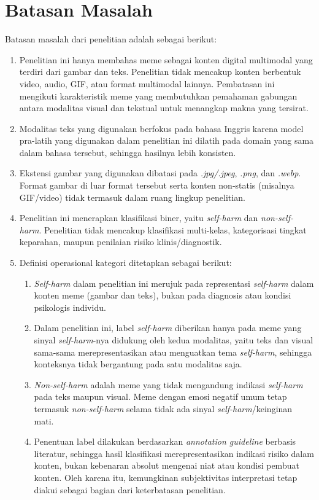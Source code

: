 \section{Batasan Masalah} \label{I.Batasan}
Batasan masalah dari penelitian adalah sebagai berikut: \par

\begin{enumerate}
    \item Penelitian ini hanya membahas meme sebagai konten digital multimodal yang terdiri dari gambar dan teks. Penelitian tidak mencakup konten berbentuk video, audio, GIF, atau format multimodal lainnya. Pembatasan ini mengikuti karakteristik meme yang membutuhkan pemahaman gabungan antara modalitas visual dan tekstual untuk menangkap makna yang tersirat.

    \item Modalitas teks yang digunakan berfokus pada bahasa Inggris karena model pra-latih yang digunakan dalam penelitian ini dilatih pada domain yang sama dalam bahasa tersebut, sehingga hasilnya lebih konsisten.

    \item Ekstensi gambar yang digunakan dibatasi pada \textit{.jpg/.jpeg}, \textit{.png}, dan \textit{.webp}. Format gambar di luar format tersebut serta konten non-statis (misalnya GIF/video) tidak termasuk dalam ruang lingkup penelitian.

    \item Penelitian ini menerapkan klasifikasi biner, yaitu \textit{self-harm} dan \textit{non-self-harm}. Penelitian tidak mencakup klasifikasi multi-kelas, kategorisasi tingkat keparahan, maupun penilaian risiko klinis/diagnostik.

    \item Definisi operasional kategori ditetapkan sebagai berikut:
    \begin{enumerate}
        \item \textit{Self-harm} dalam penelitian ini merujuk pada representasi \textit{self-harm} dalam konten meme (gambar dan teks), bukan pada diagnosis atau kondisi psikologis individu. 
        \item Dalam penelitian ini, label \textit{self-harm} diberikan hanya pada meme yang sinyal \textit{self-harm}-nya didukung oleh kedua modalitas, yaitu teks dan visual sama-sama merepresentasikan atau menguatkan tema \textit{self-harm}, sehingga konteksnya tidak bergantung pada satu modalitas saja.
        \item \textit{Non-self-harm} adalah meme yang tidak mengandung indikasi \textit{self-harm} pada teks maupun visual. Meme dengan emosi negatif umum tetap termasuk \textit{non-self-harm} selama tidak ada sinyal \textit{self-harm}/keinginan mati.
        \item Penentuan label dilakukan berdasarkan \textit{annotation guideline} berbasis literatur, sehingga hasil klasifikasi merepresentasikan indikasi risiko dalam konten, bukan kebenaran absolut mengenai niat atau kondisi pembuat konten. Oleh karena itu, kemungkinan subjektivitas interpretasi tetap diakui sebagai bagian dari keterbatasan penelitian.
    \end{enumerate}


\end{enumerate}

